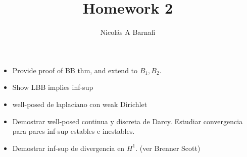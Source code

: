 \documentclass{article}
\title{Homework 2}
\author{Nicol\'as A Barnafi}
\begin{document}
\maketitle

\begin{itemize}
    \item Provide proof of BB thm, and extend to $B_1,B_2$. 
    \item Show LBB implies inf-sup
    \item well-posed de laplaciano con weak Dirichlet
    \item Demostrar well-posed continua y discreta de Darcy. Estudiar convergencia para pares inf-sup estables e inestables. 
    \item Demostrar inf-sup de divergencia en $H^1$. (ver Brenner Scott)
\end{itemize}
\end{document}
